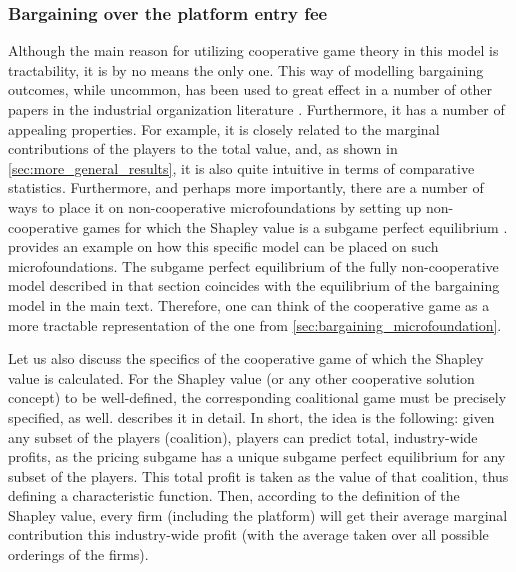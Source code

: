 \documentclass[a4paper]{article}
\begin{document}
\subsubsection{Bargaining over the platform entry fee}

Although the main reason for utilizing cooperative game theory in this model is tractability, it is by no means the only one.
This way of modelling bargaining outcomes, while uncommon, has been used to great effect in a number of other papers in the industrial organization literature \parencite[e.g.][]{montez2007downstream,hart1990property,levy1997individual,inderst2003bargaining,brugemann2019intra}.
Furthermore, it has a number of appealing properties.
For example, it is closely related to the marginal contributions of the players to the total value, and, as shown in \cref{sec:more_general_results}, it is also quite intuitive in terms of comparative statistics.
Furthermore, and perhaps more importantly, there are a number of ways to place it on non-cooperative microfoundations by setting up non-cooperative games for which the Shapley value is a subgame perfect equilibrium \parencite[e.g.][]{gul1989bargaining,hart1996bargaining,stole1996organizational}.
 provides an example on how this specific model can be placed on such microfoundations.
The subgame perfect equilibrium of the fully non-cooperative model described in that section coincides with the equilibrium of the bargaining model in the main text.
Therefore, one can think of the cooperative game as a more tractable representation of the one from \cref{sec:bargaining_microfoundation}.

Let us also discuss the specifics of the cooperative game of which the Shapley value is calculated.
For the Shapley value (or any other cooperative solution concept) to be well-defined, the corresponding coalitional game must be precisely specified, as well.
 describes it in detail. 
In short, the idea is the following: given any subset of the players (coalition), players can predict total, industry-wide profits, as the pricing subgame has a unique subgame perfect equilibrium for any subset of the players.
This total profit is taken as the value of that coalition, thus defining a characteristic function.
Then, according to the definition of the Shapley value, every firm (including the platform) will get their average marginal contribution this industry-wide profit (with the average taken over all possible orderings of the firms).
\end{document}
